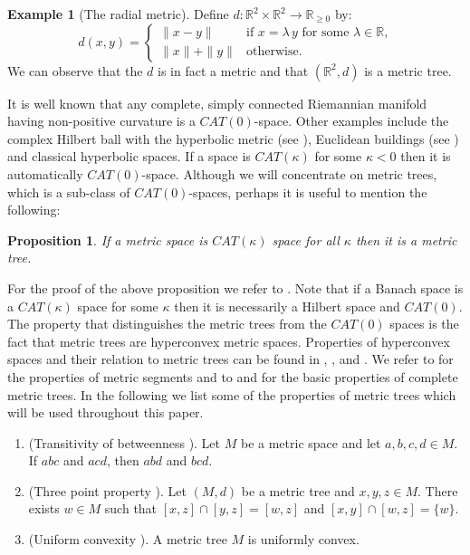 \documentclass{bcp92}
\theoremstyle{plain}
\newtheorem{pro}[thm]{Proposition}
\theoremstyle{definition}
\newtheorem{exm}[thm]{Example}
\begin{document}
\begin{exm}[The radial metric]\label{E:radial}
    Define $d: {\mathbb R}^2 \times {\mathbb R}^2 \to {\mathbb R}_{\geq 0}$ by:
    \[
        d(x,y) =
            \begin{cases}
            \|x-y\| & \text{if $x = \lambda \, y$ for some $\lambda \in {\mathbb R}$,}\\
            \|x\| + \| y \| & \text{otherwise.}
            \end{cases}
    \]
    We can observe that the $d$ is in fact a metric and that $({\mathbb R}^2,d)$ is a
metric tree.
\end{exm}

It is well known that any complete, simply connected Riemannian manifold
having non-positive curvature is a $CAT(0)$-space. Other examples include the
complex Hilbert ball with the hyperbolic metric (see \cite{Goebel}),
Euclidean buildings (see \cite{Brown}) and classical hyperbolic spaces.  If a
space is $CAT(\kappa)$ for some $\kappa < 0$ then it is automatically
$CAT(0)$-space. Although we will concentrate on metric trees, which is a
sub-class of $CAT(0)$-spaces, perhaps it is useful to mention the following:

\begin{pro}
If a metric space is $CAT(\kappa)$ space for all $\kappa$ then it is a metric
tree.
\end{pro}

 For the proof of the above proposition we refer to \cite{Brid}. Note that
if a Banach space is a $CAT(\kappa)$  space for some $\kappa$ then it is
necessarily a Hilbert space and $CAT(0)$. The property that distinguishes the
metric trees from the $CAT(0)$ spaces is the fact that metric trees are
hyperconvex metric spaces. Properties of hyperconvex spaces and their
relation to metric trees can be found in \cite{AkMa}, \cite{ap},
\cite{isbell} and \cite{kirk}.  We refer to \cite{Blum} for the properties of
metric segments and to \cite{AkBo} and \cite{AkKh} for the basic properties
of complete metric trees. In the following we list some of the properties of
metric trees which will be used throughout this paper.
\begin{enumerate}
\item (Transitivity of betweenness \cite{Blum}).  Let $M$ be a metric space
and let $a,b,c,d \in M$. If $abc$ and $acd$, then $abd$ and $bcd$.
\item  (Three point property \cite{AkBo}). Let $(M,d)$ be a metric tree and
$x,y,z \in M$.  There exists $w \in M$ such that $[x,z] \cap [y,z] = [w,z]$
and $[x,y] \cap [w,z] = \{w\}$.
\item  (Uniform convexity \cite{AkBo}). A metric tree $M$ is uniformly convex.
\end{enumerate}
\end{document}

